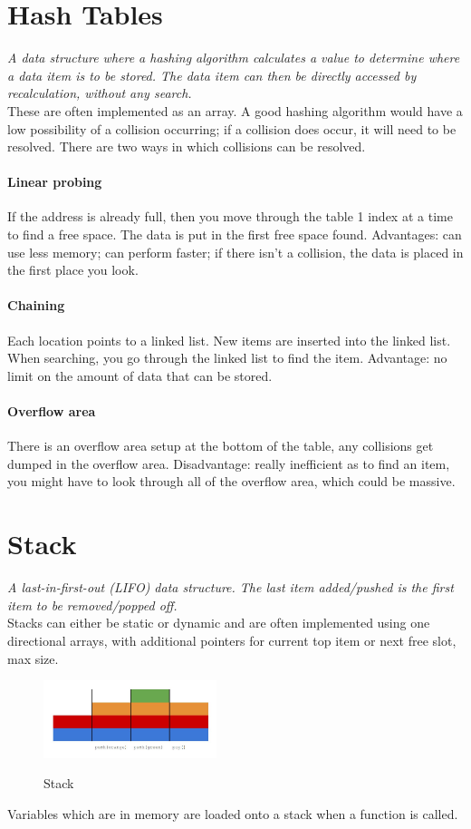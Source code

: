 \documentclass[a4paper,11pt, twocolumn]{article}
\begin{document}
\section{Hash Tables}
\textit{A data structure where a hashing algorithm calculates a value to determine where a data item is to be stored. The data item can then be directly accessed by recalculation, without any search.}\\
These are often implemented as an array. A good hashing algorithm would have a low possibility of a collision occurring; if a collision does occur, it will need to be resolved. There are two ways in which collisions can be resolved.
\paragraph*{Linear probing} If the address is already full, then you move through the table 1 index at a time to find a free space. The data is put in the first free space found. Advantages: can use less memory; can perform faster; if there isn't a collision, the data is placed in the first place you look.
\paragraph*{Chaining} Each location points to a linked list. New items are inserted into the linked list. When searching, you go through the linked list to find the item. Advantage: no limit on the amount of data that can be stored.
\paragraph*{Overflow area} There is an overflow area setup at the bottom of the table, any collisions get dumped in the overflow area. Disadvantage: really inefficient as to find an item, you might have to look through all of the overflow area, which could be massive.

\section{Stack}
\textit{A last-in-first-out (LIFO) data structure. The last item added/pushed is the first item to be removed/popped off.}\\
Stacks can either be static or dynamic and are often implemented using one directional arrays, with additional pointers for current top item or next free slot, max size.
\begin{figure}[H]
    \centering
    \includegraphics[width=0.45\textwidth]{stack.jpg}
    \label{fig:stack}
    \caption{Stack}
\end{figure}
\noindent Variables which are in memory are loaded onto a stack when a function is called. 
\end{document}
